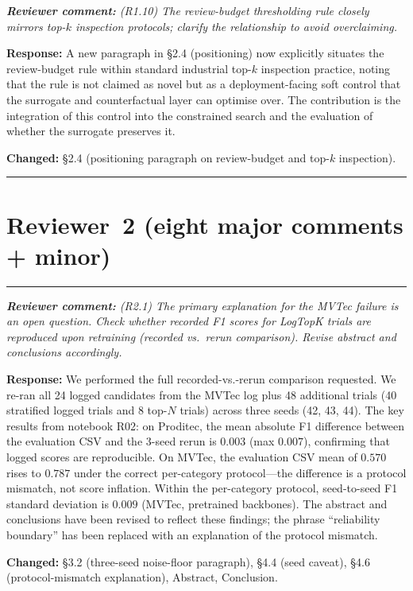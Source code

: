 \documentclass[11pt,a4paper]{article}
\newcommand{\revquote}[1]{\smallskip\noindent\textit{\textbf{Reviewer comment:} #1}\smallskip}
\newcommand{\response}[1]{\noindent\textbf{Response:} #1\par}
\begin{document}
\bigskip

\revquote{(R1.10) The review-budget thresholding rule closely mirrors
top-$k$ inspection protocols; clarify the relationship to avoid
overclaiming.}

\response{A new paragraph in \S2.4 (positioning) now explicitly
situates the review-budget rule within standard industrial top-$k$
inspection practice, noting that the rule is not claimed as novel but
as a deployment-facing soft control that the surrogate and
counterfactual layer can optimise over. The contribution is the
integration of this control into the constrained search and the
evaluation of whether the surrogate preserves it.

\noindent\textbf{Changed:} \S2.4 (positioning paragraph on
review-budget and top-$k$ inspection).}

\bigskip
\hrule
\section*{Reviewer~2 (eight major comments + minor)}
\hrule
\bigskip

\revquote{(R2.1) The primary explanation for the MVTec failure is an open
question. Check whether recorded F1 scores for LogTopK trials are
reproduced upon retraining (recorded vs.\ rerun comparison). Revise
abstract and conclusions accordingly.}

\response{We performed the full recorded-vs.-rerun comparison requested.
We re-ran all 24 logged candidates from the MVTec log plus 48
additional trials (40 stratified logged trials and 8 top-$N$ trials)
across three seeds (42, 43, 44). The key results from notebook R02:
on Proditec, the mean absolute F1 difference between the evaluation CSV
and the 3-seed rerun is $0.003$ (max $0.007$), confirming that logged
scores are reproducible. On MVTec, the evaluation CSV mean of $0.570$
rises to $0.787$ under the correct per-category protocol---the
difference is a protocol mismatch, not score inflation. Within the
per-category protocol, seed-to-seed F1 standard deviation is $0.009$
(MVTec, pretrained backbones). The abstract and conclusions have been
revised to reflect these findings; the phrase ``reliability boundary''
has been replaced with an explanation of the protocol mismatch.

\noindent\textbf{Changed:} \S3.2 (three-seed noise-floor paragraph),
\S4.4 (seed caveat), \S4.6 (protocol-mismatch explanation), Abstract,
Conclusion.}

\bigskip
\end{document}
